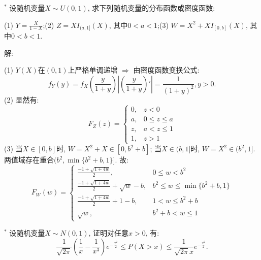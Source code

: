 \documentclass[standard]{ExBook}
\renewenvironment{shaded}{%
  \def\FrameCommand{\fboxsep=\FrameSep \colorbox{shadecolor}}%
  \MakeFramed{\advance\hsize-\width \FrameRestore}%
}{%
  \endMakeFramed
}
\begin{document}
\begin{qitems}
\vspace{2.5cm-5em}

    \begin{bbox}
    \begin{shaded}
        \qitem$^{*}$
设随机变量$X\sim U(0,1)$, 求下列随机变量的分布函数或密度函数:

(1) $Y=\frac{X}{1-X}$;\qquad(2) $Z=XI_{(a,1]}(X)$, 其中$0 < a < 1$;\qquad(3) $W=X^2+XI_{[0,b]}(X)$, 其中$0 < b < 1$.
    \end{shaded}
    \end{bbox}

\vspace{\dimexpr2.5cm-5em\relax}

解: 

(1) $Y(X)$在$(0,1)$上严格单调递增 $\Longrightarrow$ 由密度函数变换公式:
$$f_{Y}(y)=f_{X}(\displaystyle\frac{y}{1+y})\left|\left(\displaystyle\frac{y}{1+y}\right)'\right|=\displaystyle\frac{1}{(1+y)^2}, y>0.$$
(2) 显然有:
$$
    F_{Z}(z)=
    \left\{
    \begin{array}{ll}
        0, &z<0\\
        a, &0\leq z\leq a\\
        z, &a<z\leq 1\\
        1, &z>1
    \end{array}
    \right.
$$
(3) 当$X\in[0,b]$时, $W=X^2+X\in[0,b^2+b]$; 当$X\in(b,1]$时, $W=X^2\in(b^2,1]$. 两值域存在重合$(b^2,\min\{b^2+b,1\}]$. 故:
$$
    F_{W}(w)=
    \left\{
    \begin{array}{ll}
\frac{-1+\sqrt{1+4w}}{2}, &0\leq w<b^2\\
\frac{-1+\sqrt{1+4w}}{2}+\sqrt{w}-b, &b^2\leq w\leq\min\{b^2+b,1\}\\
\frac{-1+\sqrt{1+4w}}{2}+1-b, &1< w\leq b^2+b\\
\sqrt{w}, &b^2+b<w\leq 1
    \end{array}
    \right.
$$

\vspace{2.5cm-5em}

    \begin{bbox}
    \begin{shaded}
        \qitem$^{*}$
设随机变量$X\sim N(0,1)$, 证明对任意$x > 0$, 有:
$$\frac{1}{\sqrt{2\pi}}\left(\frac{1}{x}-\frac{1}{x^3}\right)e^{-\frac{x^2}{2}} \leq P(X>x) \leq \frac{1}{\sqrt{2\pi}x}e^{-\frac{x^2}{2}}.$$
    \end{shaded}
    \end{bbox}

\vspace{\dimexpr2.5cm-5em\relax}


\end{qitems}
\end{document}
